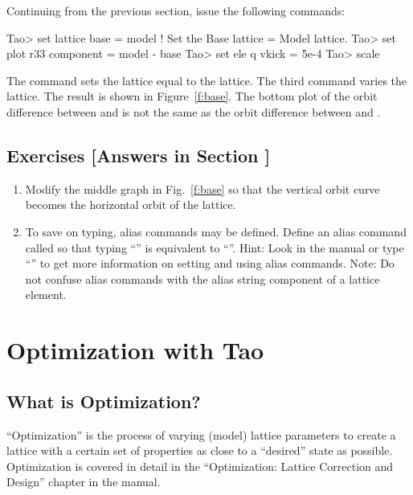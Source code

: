 \documentclass{hitec}     %
\newcommand{\Section}[1]{\section{#1}\vspace*{-1ex}}
\begin{document}
Continuing from the previous section, issue the following commands:
\begin{code}
Tao> set lattice base = model  ! Set the Base lattice = Model lattice.
Tao> set plot r33 component = model - base
Tao> set ele q vkick = 5e-4
Tao> scale
\end{code} 
The  command sets the  lattice equal to the 
lattice. The third command varies the  lattice.  The result is shown in
Figure~\ref{f:base}. The bottom plot of the orbit difference between  and
 is not the same as the orbit difference between  and .

\vspace{1in}

\subsection{Exercises [Answers in Section ]}
\label{s:three.lat.ex}

\begin{enumerate}[label=\thesection.\arabic{enumi}]
\item
Modify the middle graph in Fig.~\ref{f:base} so that the vertical orbit curve becomes the horizontal
orbit of the  lattice.
\item
To save on typing, alias commands may be defined. Define an alias command called  so that
typing ``'' is equivalent to ``''. Hint: Look in the
manual or type ``'' to get more information on setting and using alias commands.
Note: Do not confuse \tao alias commands with the alias string component of a lattice element.
\end{enumerate}

\newpage

\Section{Optimization with Tao}
\label{s:optimization}

\subsection{What is Optimization?}
\label{s:opt.what}

``Optimization'' is the process of varying (model) lattice parameters to create a lattice with a
certain set of properties as close to a ``desired'' state as possible. Optimization is covered in
detail in the ``Optimization: Lattice Correction and Design'' chapter in the \tao manual.
\end{document}
